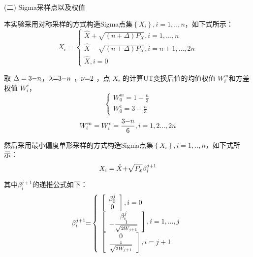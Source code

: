(二)	Sigma采样点以及权值

本实验采用对称采样的方式构造Sigma点集$\left\{ {{X_i}} \right\},i = 1,..,n$，如下式所示：
\begin{equation}
{X_i} = \left\{ \begin{array}{l}
\hat X + \sqrt {(n + \Delta ){P_X}} ,i = 1,...,n\\
\hat X - \sqrt {(n + \Delta ){P_X}} ,i = n + 1,...,2n\\
\hat X,i = 0
\end{array} \right.
\end{equation}

取 $\Delta  = 3{\rm{ - }}n$，$\lambda {\rm{ = }}3{\rm{ - }}n$ ，$\nu {\rm{ = }}2$ ，点 ${X_i}$ 的计算UT变换后值的均值权值 $W_i^m$和方差权值 $W_i^c$，	
\begin{equation}
\left\{ \begin{array}{l}
W_0^m = 1 - \frac{n}{3}\\
W_0^c = 3 - \frac{n}{3}
\end{array} \right.
\end{equation}
\begin{equation}
W_i^m = W_i^c = \frac{{3{\rm{ - }}n}}{6},i = 1,2...,2n
\end{equation}

然后采用最小偏度单形采样的方式构造Sigma点集$\left\{ {{X_i}} \right\},i = 1,..,n$，如下式所示：
\begin{equation}
{X_i} = \hat X{\rm{ + }}\sqrt {{P_x}} \beta _i^{j + 1}
\end{equation}

其中$\beta _i^{j + 1}$的递推公式如下：
\begin{equation}
\beta _i^{j + 1}{\rm{ = }}\left\{ \begin{array}{l}
\left[ {\begin{array}{*{20}{c}}
{\beta _0^j}\\
0
\end{array}} \right],i = 0\\
\left[ {\begin{array}{*{20}{c}}
{\beta _i^j}\\
{ - \frac{1}{{\sqrt {2{W_{j + 1}}} }}}
\end{array}} \right],i = 1,...,j\\
\left[ {\begin{array}{*{20}{c}}
0\\
{\frac{1}{{\sqrt {2{W_{j + 1}}} }}}
\end{array}} \right],i = j + 1
\end{array} \right.
\end{equation}


